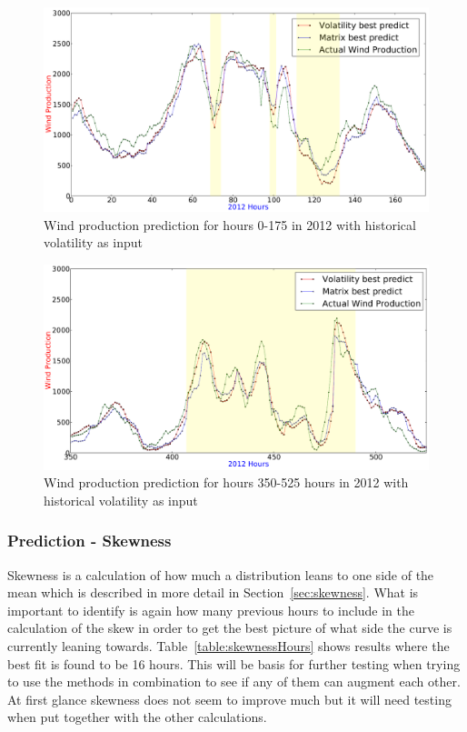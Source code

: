 \begin{figure}[H]
\centering
\includegraphics[width=0.99\linewidth]{billeder/bestVolatilityVsMatrixGraph.png}
\caption{Wind production prediction for hours 0-175 in 2012 with historical volatility as input}
\label{fig:bestVolatilityVsMatrixGraph}
\end{figure} 

\begin{figure}[H]
\centering
\includegraphics[width=0.99\linewidth]{billeder/bestVolatilityVsMatrixGraph350-525.png}
\caption{Wind production prediction for hours 350-525 hours in 2012 with historical volatility as input}
\label{fig:bestVolatilityVsMatrixGraph350-525}
\end{figure} 

\subsubsection{Prediction - Skewness}
Skewness is a calculation of how much a distribution leans to one side of the mean which is described in more detail in Section~\ref{sec:skewness}. What is important to identify is again how many previous hours to include in the calculation of the skew in order to get the best picture of what side the curve is currently leaning towards. Table~\ref{table:skewnessHours} shows results where the best fit is found to be 16 hours. This will be basis for further testing when trying to use the methods in combination to see if any of them can augment each other. At first glance skewness does not seem to improve much but it will need testing when put together with the other calculations.

